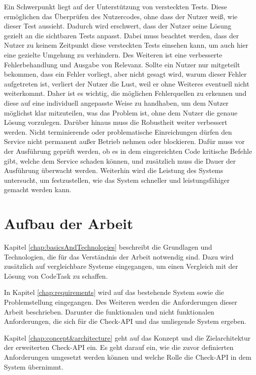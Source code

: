 Ein Schwerpunkt liegt auf der Unterstützung von versteckten Tests. Diese ermöglichen das Überprüfen des Nutzercodes, ohne dass der Nutzer weiß, wie dieser Test aussieht. Dadurch wird erschwert, dass der Nutzer seine Lösung gezielt an die sichtbaren Tests anpasst. Dabei muss beachtet werden, dass der Nutzer zu keinem Zeitpunkt diese versteckten Tests einsehen kann, um auch hier eine gezielte Umgehung zu verhindern.
Des Weiteren ist eine verbesserte Fehlerbehandlung und Ausgabe von Relevanz. Sollte ein Nutzer nur mitgeteilt bekommen, dass ein Fehler vorliegt, aber nicht gesagt wird, warum dieser Fehler aufgetreten ist, verliert der Nutzer die Lust, weil er ohne Weiteres eventuell nicht weiterkommt. Daher ist es wichtig, die möglichen Fehlerquellen zu erkennen und diese auf eine individuell angepasste Weise zu handhaben, um dem Nutzer möglichst klar mitzuteilen, was das Problem ist, ohne dem Nutzer die genaue Lösung vorzulegen.
Darüber hinaus muss die Robustheit weiter verbessert werden. Nicht terminierende oder problematische Einreichungen dürfen den Service nicht permanent außer Betrieb nehmen oder blockieren. Dafür muss vor der Ausführung geprüft werden, ob es in dem eingereichten Code kritische Befehle gibt, welche dem Service schaden können, und zusätzlich muss die Dauer der Ausführung überwacht werden.
Weiterhin wird die Leistung des Systems untersucht, um festzustellen, wie das System schneller und leistungsfähiger gemacht werden kann.

\section{Aufbau der Arbeit}
Kapitel \ref{chap:basicsAndTechnologies} beschreibt die Grundlagen und Technologien, die für das Verständnis der Arbeit notwendig sind. Dazu wird zusätzlich auf vergleichbare Systeme eingegangen, um einen Vergleich mit der Lösung von CodeTask zu schaffen.

In Kapitel \ref{chap:requirements} wird auf das bestehende System sowie die Problemstellung eingegangen. Des Weiteren werden die Anforderungen dieser Arbeit beschrieben. Darunter die funktionalen und nicht funktionalen Anforderungen, die sich für die Check-API und das umliegende System ergeben.

Kapitel \ref{chap:concept&architecture} geht auf das Konzept und die Zielarchitektur der erweiterten Check-API ein. Es geht darauf ein, wie die zuvor definierten Anforderungen umgesetzt werden können und welche Rolle die Check-API in dem System übernimmt.

